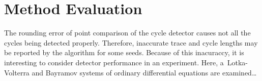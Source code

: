 \documentclass[12pt,oneside,draft]{fithesis}
\begin{document}
\chapter{Method Evaluation}

The rounding error of point comparison of the cycle detector causes
not all the cycles being detected properly. Therefore, inaccurate trace
and cycle lengths may be reported by the algorithm for some seeds.
Because of this inacuraccy, it is interesting to consider detector
performance in an experiment. Here, a~Lotka-Volterra and Bayramov
systems of ordinary differential equations are examined\dots


\end{document}
